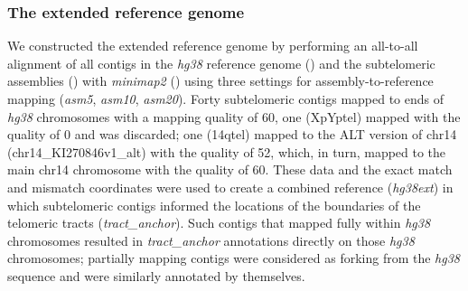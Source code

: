 \documentclass{article}
\newcommand{\citep}[1]{(\cite{#1})}
\begin{document}
\subsubsection*{The extended reference genome}
We constructed the extended reference genome by performing an all-to-all alignment of all contigs in the \textit{hg38} reference genome \citep{grch38,hg38} and the subtelomeric assemblies \citep{riethman2014} with \textit{minimap2} \citep{minimap} using three settings for assembly-to-reference mapping (\textit{asm5}, \textit{asm10}, \textit{asm20}).
Forty subtelomeric contigs mapped to ends of \textit{hg38} chromosomes with a mapping quality of 60, one (XpYptel) mapped with the quality of 0 and was discarded; one (14qtel) mapped to the ALT version of chr14 (chr14\_KI270846v1\_alt) with the quality of 52, which, in turn, mapped to the main chr14 chromosome with the quality of 60.
These data and the exact match and mismatch coordinates were used to create a combined reference (\textit{hg38ext}) in which subtelomeric contigs informed the locations of the boundaries of the telomeric tracts (\textit{tract\_anchor}).
Such contigs that mapped fully within \textit{hg38} chromosomes resulted in \textit{tract\_anchor} annotations directly on those \textit{hg38} chromosomes; partially mapping contigs were considered as forking from the \textit{hg38} sequence and were similarly annotated by themselves.
\end{document}
